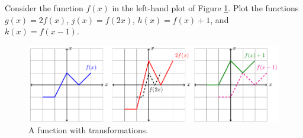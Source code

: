 \bex
Consider the function $f(x)$ in the left-hand plot of Figure \ref{F:0.3.Ex1}.  Plot the
functions $g(x) = 2f(x)$, $j(x) = f(2x)$, $h(x) = f(x)+1$, and $k(x) = f(x-1)$.
\eex
\begin{figure}[ht!]
    \begin{center}
        \includegraphics[width=0.95\columnwidth]{figures/0-3-fig1.pdf}
    \end{center}
    \caption{A function with transformations.}
    \label{F:0.3.Ex1}
\end{figure}
